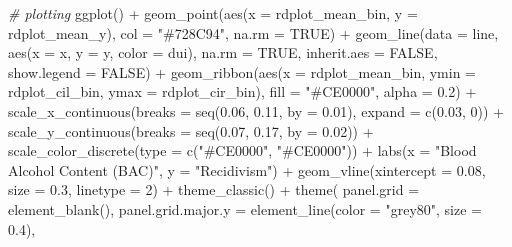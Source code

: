 \documentclass[
  11pt,
]{article}
\newenvironment{Shaded}{\begin{snugshade}}{\end{snugshade}}
\newcommand{\AttributeTok}[1]{\textcolor[rgb]{0.77,0.63,0.00}{#1}}
\newcommand{\CommentTok}[1]{\textcolor[rgb]{0.56,0.35,0.01}{\textit{#1}}}
\newcommand{\ConstantTok}[1]{\textcolor[rgb]{0.00,0.00,0.00}{#1}}
\newcommand{\DecValTok}[1]{\textcolor[rgb]{0.00,0.00,0.81}{#1}}
\newcommand{\FloatTok}[1]{\textcolor[rgb]{0.00,0.00,0.81}{#1}}
\newcommand{\FunctionTok}[1]{\textcolor[rgb]{0.00,0.00,0.00}{#1}}
\newcommand{\NormalTok}[1]{#1}
\newcommand{\SpecialCharTok}[1]{\textcolor[rgb]{0.00,0.00,0.00}{#1}}
\newcommand{\StringTok}[1]{\textcolor[rgb]{0.31,0.60,0.02}{#1}}
\begin{document}
\begin{Shaded}
\begin{Highlighting}[]
\CommentTok{\# plotting}
\FunctionTok{ggplot}\NormalTok{() }\SpecialCharTok{+}
  \FunctionTok{geom\_point}\NormalTok{(}\FunctionTok{aes}\NormalTok{(}\AttributeTok{x =}\NormalTok{ rdplot\_mean\_bin, }\AttributeTok{y =}\NormalTok{ rdplot\_mean\_y),}
            \AttributeTok{col =} \StringTok{"\#728C94"}\NormalTok{, }\AttributeTok{na.rm =} \ConstantTok{TRUE}\NormalTok{) }\SpecialCharTok{+}
  \FunctionTok{geom\_line}\NormalTok{(}\AttributeTok{data =}\NormalTok{ line, }\FunctionTok{aes}\NormalTok{(}\AttributeTok{x =}\NormalTok{ x, }\AttributeTok{y =}\NormalTok{ y, }\AttributeTok{color =}\NormalTok{ dui),}
            \AttributeTok{na.rm =} \ConstantTok{TRUE}\NormalTok{, }\AttributeTok{inherit.aes =} \ConstantTok{FALSE}\NormalTok{, }\AttributeTok{show.legend =} \ConstantTok{FALSE}\NormalTok{) }\SpecialCharTok{+}
  \FunctionTok{geom\_ribbon}\NormalTok{(}\FunctionTok{aes}\NormalTok{(}\AttributeTok{x =}\NormalTok{ rdplot\_mean\_bin, }\AttributeTok{ymin =}\NormalTok{ rdplot\_cil\_bin, }\AttributeTok{ymax =}\NormalTok{ rdplot\_cir\_bin),}
              \AttributeTok{fill =} \StringTok{"\#CE0000"}\NormalTok{, }\AttributeTok{alpha =} \FloatTok{0.2}\NormalTok{) }\SpecialCharTok{+}
  \FunctionTok{scale\_x\_continuous}\NormalTok{(}\AttributeTok{breaks =} \FunctionTok{seq}\NormalTok{(}\FloatTok{0.06}\NormalTok{, }\FloatTok{0.11}\NormalTok{, }\AttributeTok{by =} \FloatTok{0.01}\NormalTok{), }\AttributeTok{expand =} \FunctionTok{c}\NormalTok{(}\FloatTok{0.03}\NormalTok{, }\DecValTok{0}\NormalTok{)) }\SpecialCharTok{+}
  \FunctionTok{scale\_y\_continuous}\NormalTok{(}\AttributeTok{breaks =} \FunctionTok{seq}\NormalTok{(}\FloatTok{0.07}\NormalTok{, }\FloatTok{0.17}\NormalTok{, }\AttributeTok{by =} \FloatTok{0.02}\NormalTok{)) }\SpecialCharTok{+}
  \FunctionTok{scale\_color\_discrete}\NormalTok{(}\AttributeTok{type =} \FunctionTok{c}\NormalTok{(}\StringTok{"\#CE0000"}\NormalTok{, }\StringTok{"\#CE0000"}\NormalTok{)) }\SpecialCharTok{+}
  \FunctionTok{labs}\NormalTok{(}\AttributeTok{x =} \StringTok{"Blood Alcohol Content (BAC)"}\NormalTok{, }\AttributeTok{y =} \StringTok{"Recidivism"}\NormalTok{) }\SpecialCharTok{+}
  \FunctionTok{geom\_vline}\NormalTok{(}\AttributeTok{xintercept =} \FloatTok{0.08}\NormalTok{, }\AttributeTok{size =} \FloatTok{0.3}\NormalTok{, }\AttributeTok{linetype =} \DecValTok{2}\NormalTok{) }\SpecialCharTok{+}
  \FunctionTok{theme\_classic}\NormalTok{() }\SpecialCharTok{+}
  \FunctionTok{theme}\NormalTok{(}
    \AttributeTok{panel.grid =} \FunctionTok{element\_blank}\NormalTok{(),}
    \AttributeTok{panel.grid.major.y =} \FunctionTok{element\_line}\NormalTok{(}\AttributeTok{color =} \StringTok{"grey80"}\NormalTok{, }\AttributeTok{size =} \FloatTok{0.4}\NormalTok{),}

\end{Highlighting}
\end{Shaded}
\end{document}
